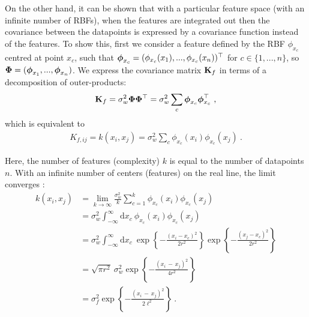 	On the other hand, it can be shown that with a particular feature space (with an infinite number of RBFs),
	when the features are integrated out then the covariance between the
	datapoints is expressed by a covariance function instead of the features.
	To show this,
	first we consider a feature defined by the RBF $\phi_{x_c}$ centred at point
	$x_c$, such that $\boldsymbol{\phi}_{x_c} = (\phi_{x_c}(x_1),..., \phi_{x_c}(x_n))^\top$ for $c \in \{1,...,n\}$, so
	$\mathbf{\Phi} = (\boldsymbol{\phi}_{x_1},...,\boldsymbol{\phi}_{x_n})$.
	We express the covariance matrix $\mathbf{K}_f$ in terms of a decomposition of outer-products:
	\begin{align*}
	  \mathbf{K}_f =  \sigma^2_w \mathbf{\Phi} \mathbf{\Phi}^\top = \sigma^2_w \sum_c \boldsymbol{\phi}_{x_c} \boldsymbol{\phi}_{x_c}^\top ~,
	\end{align*}
	which is equivalent to
	\begin{align} \label{equ:chap2_covfunc}
	  K_{f,ij} =  k(x_i, x_j) = \sigma^2_w \sum_c \phi_{x_c}(x_i) \phi_{x_c}(x_j) ~.
	\end{align}

	Here, the number of features (complexity) $k$ is equal to the number of datapoints $n$. With an infinite
	number of centers (features) on the real line, the limit converges \citep{Mackay:introGP98}:
	\begin{equation} \label{equ:chap2_covfunc2}
	  \begin{split}
	    k(x_i, x_j) &= \lim_{k \rightarrow \infty} \frac{\sigma^2_w}{k} \sum_{c=1}^{k} \phi_{x_c}(x_i) \phi_{x_c}(x_j) \\
	    &= \sigma^2_w \int_{-\infty}^{\infty} \textrm{d}x_c ~ \phi_{x_c}(x_i) \phi_{x_c}(x_j) \\
	    &= \sigma^2_w \int_{-\infty}^{\infty} \textrm{d}x_c ~ \exp \left\{ -\frac{(x_i-x_c)^2}{2r^2} \right\}
	      \exp \left\{-\frac{(x_j - x_c)^2}{2r^2} \right\} \\
	    &= \sqrt{\pi r^2} ~ \sigma^2_w \exp \left\{ -\frac{(x_i \,-\, x_j)^2}{4r^2} \right\} \\
	    &= \sigma^2_f \exp \left\{ -\frac{(x_i \,-\, x_j)^2}{2 \ell^2} \right\} ~.%
	  \end{split}
	\end{equation}

